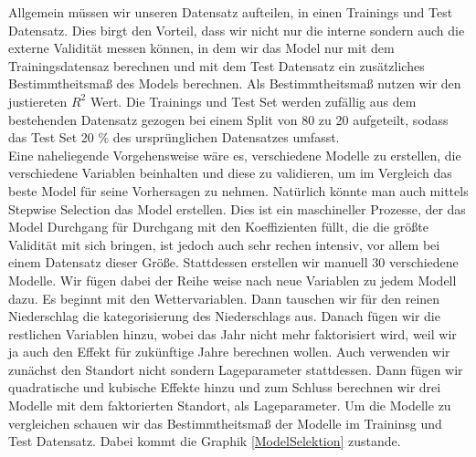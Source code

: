 \documentclass[a4paper,12pt]{thesis}
\begin{document}
Allgemein müssen wir unseren Datensatz aufteilen, in einen Trainings und Test Datensatz. Dies birgt den Vorteil, dass wir nicht nur die interne sondern auch die externe Validität messen können, in dem wir das Model nur mit dem Trainingsdatensaz berechnen und mit dem Test Datensatz ein zusätzliches Bestimmtheitsmaß des Models berechnen. Als Bestimmtheitsmaß nutzen wir den justiereten $R^2$ Wert. Die Trainings und Test Set werden zufällig aus dem bestehenden Datensatz gezogen bei einem Split von 80 zu 20 aufgeteilt, sodass das Test Set 20 \% des ursprünglichen Datensatzes umfasst.\\
Eine naheliegende Vorgehensweise wäre es, verschiedene Modelle zu erstellen, die verschiedene Variablen beinhalten und diese zu validieren, um im Vergleich das beste Model für seine Vorhersagen zu nehmen. Natürlich könnte man auch mittels Stepwise Selection das Model erstellen. Dies ist ein maschineller Prozesse, der das Model Durchgang für Durchgang mit den Koeffizienten füllt, die die größte Validität mit sich bringen, ist jedoch auch sehr rechen intensiv, vor allem bei einem Datensatz dieser Größe. Stattdessen erstellen wir manuell 30 verschiedene Modelle. Wir fügen dabei der Reihe weise nach neue Variablen zu jedem Modell dazu. Es beginnt mit den Wettervariablen. Dann tauschen wir für den reinen Niederschlag die kategorisierung des Niederschlags aus. Danach fügen wir die restlichen Variablen hinzu, wobei das Jahr nicht mehr faktorisiert wird, weil wir ja auch den Effekt für zukünftige Jahre berechnen wollen. Auch verwenden wir zunächst den Standort nicht sondern Lageparameter stattdessen. Dann fügen wir quadratische und kubische Effekte hinzu und zum Schluss berechnen wir drei Modelle mit dem faktorierten Standort, als Lageparameter. Um die Modelle zu vergleichen schauen wir das Bestimmtheitsmaß der Modelle im Traininsg und Test Datensatz. Dabei kommt die Graphik \ref{ModelSelektion} zustande.
\end{document}
